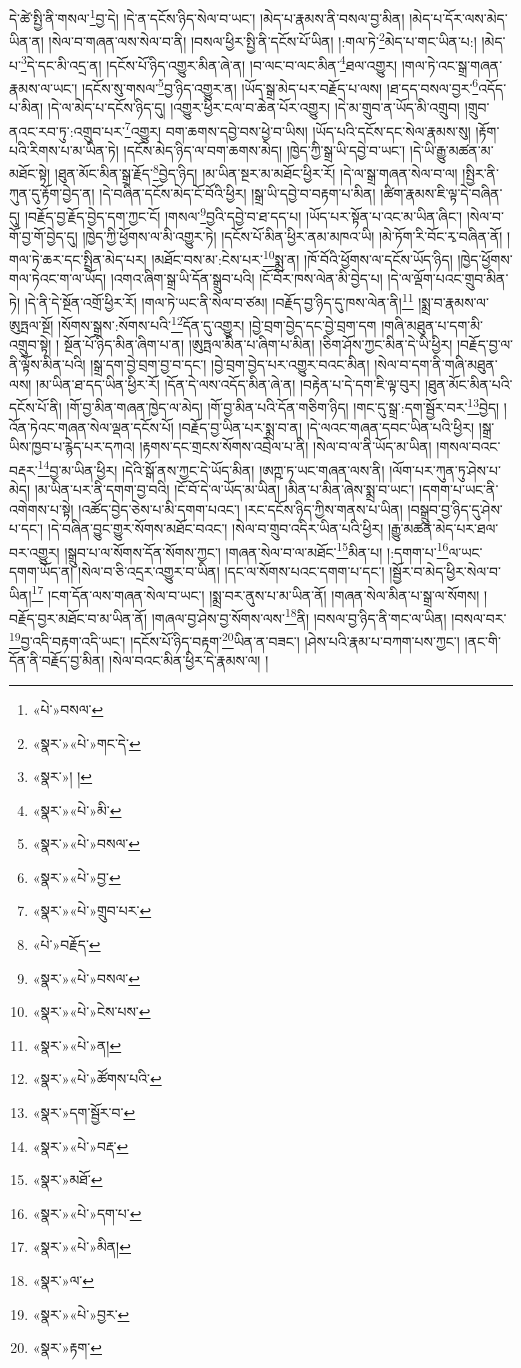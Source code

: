 དེ་ཚེ་སྤྱི་ནི་གསལ་\footnote{«པེ་»བསལ་}བྱ་དེ། །དེ་ན་དངོས་ཉིད་སེལ་བ་ཡང་། །མེད་པ་རྣམས་ནི་བསལ་བྱ་མིན། །མེད་པ་དོར་ལས་མེད་ཡིན་ན། །སེལ་བ་གཞན་ལས་སེལ་བ་ནི། །བསལ་ཕྱིར་སྤྱི་ནི་དངོས་པོ་ཡིན། །:གལ་ཏེ་\footnote{«སྣར་»«པེ་»གང་དེ་}མེད་པ་གང་ཡིན་པ:། །མེད་པ་\footnote{«སྣར་»། །}དེ་དང་མི་འདྲ་ན། །དངོས་པོ་ཉིད་འགྱུར་མིན་ཞེ་ན། །བ་ལང་བ་ལང་མིན་\footnote{«སྣར་»«པེ་»མི་}ཐལ་འགྱུར། །གལ་ཏེ་འང་སྒྲ་གཞན་རྣམས་ལ་ཡང་། །དངོས་སུ་གསལ་\footnote{«སྣར་»«པེ་»བསལ་}བྱ་ཉིད་འགྱུར་ན། །ཡོད་སྒྲ་མེད་པར་བརྗོད་པ་ལས། །ཐ་དད་བསལ་བྱར་\footnote{«སྣར་»«པེ་»བྱ་}འདོད་པ་མིན། །དེ་ལ་མེད་པ་དངོས་ཉིད་དུ། །འགྱུར་ཕྱིར་ངལ་བ་ཆེན་པོར་འགྱུར། །དེ་མ་གྲུབ་ན་ཡོད་མི་འགྲུབ། །གྲུབ་ནའང་རབ་ཏུ་:འགྲུབ་པར་\footnote{«སྣར་»«པེ་»གྲུབ་པར་}འགྱུར། བག་ཆགས་དབྱེ་བས་ཕྱེ་བ་ཡིས། །ཡོད་པའི་དངོས་དང་སེལ་རྣམས་སུ། །རྟོག་པའི་རིགས་པ་མ་ཡིན་ཏེ། །དངོས་མེད་ཉིད་ལ་བག་ཆགས་མེད། །ཁྱེད་ཀྱི་སྒྲ་ཡི་དབྱེ་བ་ཡང་། །དེ་ཡི་རྒྱུ་མཚན་མ་མཐོང་སྟེ། །ཐུན་མོང་མིན་སྒྲ་རྗོད་\footnote{«པེ་»བརྗོད་}བྱེད་ཉིད། །མ་ཡིན་སྔར་མ་མཐོང་ཕྱིར་རོ། །དེ་ལ་སྒྲ་གཞན་སེལ་བ་ལ། །སྤྱིར་ནི་ཀུན་དུ་རྟོག་བྱེད་ན། །དེ་བཞིན་དངོས་མེད་ངོ་བོའི་ཕྱིར། །སྒྲ་ཡི་དབྱེ་བ་བརྟག་པ་མིན། །ཚིག་རྣམས་ཇི་ལྟ་དེ་བཞིན་དུ། །བརྗོད་བྱ་རྗོད་བྱེད་དག་ཀྱང་ངོ། །གསལ་\footnote{«སྣར་»«པེ་»བསལ་}བྱའི་དབྱེ་བ་ཐ་དད་པ། །ཡོད་པར་སྟོན་པ་འང་མ་ཡིན་ཞིང་། །སེལ་བ་གོ་བྱ་གོ་བྱེད་དུ། །ཁྱེད་ཀྱི་ཕྱོགས་ལ་མི་འགྱུར་ཏེ། །དངོས་པོ་མིན་ཕྱིར་ནམ་མཁའ་ཡི། །མེ་ཏོག་རི་བོང་རྭ་བཞིན་ནོ། །གལ་ཏེ་ཆར་དང་སྤྲིན་མེད་པར། །མཐོང་བས་མ་:ངེས་པར་\footnote{«སྣར་»«པེ་»ངེས་པས་}སྨྲ་ན། །ཁོ་བོའི་ཕྱོགས་ལ་དངོས་ཡོད་ཉིད། །ཁྱེད་ཕྱོགས་གལ་ཏེའང་ག་ལ་ཡོད། །འགའ་ཞིག་སྒྲ་ཡི་དོན་སྒྲུབ་པའི། །ངོ་བོར་ཁས་ལེན་མི་བྱེད་པ། །དེ་ལ་ལྡོག་པའང་གྲུབ་མིན་ཏེ། །དེ་ནི་དེ་སྔོན་འགྲོ་ཕྱིར་རོ། །གལ་ཏེ་ཡང་ནི་སེལ་བ་ཙམ། །བརྗོད་བྱ་ཉིད་དུ་ཁས་ལེན་ནི།\footnote{«སྣར་»«པེ་»ན།} །སྨྲ་བ་རྣམས་ལ་ཨུཏྤལ་སྔོ། །སོགས་སྒྲས་:སོགས་པའི་\footnote{«སྣར་»«པེ་»ཚོགས་པའི་}དོན་དུ་འགྱུར། །བྱེ་བྲག་བྱེད་དང་བྱེ་བྲག་དག །གཞི་མཐུན་པ་དག་མི་འགྲུབ་སྟེ། །
སྔོན་པོ་ཉིད་མིན་ཞིག་པ་ན། །ཨུཏྤལ་མིན་པ་ཞིག་པ་མིན། །ཅིག་ཤོས་ཀྱང་མིན་དེ་ཡི་ཕྱིར། །བརྗོད་བྱ་ལ་ནི་ལྟོས་མིན་པའི། །སྒྲ་དག་བྱེ་བྲག་བྱ་བ་དང་། །བྱེ་བྲག་བྱེད་པར་འགྱུར་བའང་མིན། །སེལ་བ་དག་ནི་གཞི་མཐུན་ལས། །མ་ཡིན་ཐ་དད་ཡིན་ཕྱིར་རོ། །དོན་དེ་ལས་འདོད་མིན་ཞེ་ན། །བརྟེན་པ་དེ་དག་ཇི་ལྟ་བུར། །ཐུན་མོང་མིན་པའི་དངོས་པོ་ནི། །གོ་བྱ་མིན་གཞན་ཁྱེད་ལ་མེད། །གོ་བྱ་མིན་པའི་དོན་གཅིག་ཉིད། །གང་དུ་སྒྲ་:དག་སྦྱོར་བར་\footnote{«སྣར་»དག་སྦྱོར་བ་}བྱེད། །འོན་ཏེའང་གཞན་སེལ་ལྡན་དངོས་པོ། །བརྗོད་བྱ་ཡིན་པར་སྨྲ་བ་ན། །དེ་ལའང་གཞན་དབང་ཡིན་པའི་ཕྱིར། །སྒྲ་ཡིས་ཁྱབ་པ་རྙེད་པར་དཀའ། །རྟགས་དང་གྲངས་སོགས་འབྲེལ་པ་ནི། །སེལ་བ་ལ་ནི་ཡོད་མ་ཡིན། །གསལ་བའང་བརྡར་\footnote{«སྣར་»«པེ་»བརྡ་}བྱ་མ་ཡིན་ཕྱིར། །དེའི་སྒོ་ནས་ཀྱང་དེ་ཡོད་མིན། །ཨཀྵ་ཏ་ཡང་གཞན་ལས་ནི། །ལོག་པར་ཀུན་ཏུ་ཤེས་པ་མེད། །མ་ཡིན་པར་ནི་དགག་བྱ་བའི། །ངོ་བོ་དེ་ལ་ཡོད་མ་ཡིན། །མིན་པ་མིན་ཞེས་སྨྲ་བ་ཡང་། །དགག་པ་ཡང་ནི་འགེགས་པ་སྟེ། །འཚོད་བྱེད་ཅེས་པ་མི་དགག་པའང་། །རང་དངོས་ཉིད་ཀྱིས་གནས་པ་ཡིན། །བསྒྲུབ་བྱ་ཉིད་དུ་ཤེས་པ་དང་། །དེ་བཞིན་བྱུང་གྱུར་སོགས་མཐོང་བའང་། །སེལ་བ་གྲུབ་འདིར་ཡིན་པའི་ཕྱིར། །རྒྱུ་མཚན་མེད་པར་ཐལ་བར་འགྱུར། །སྒྲུབ་པ་ལ་སོགས་དོན་སོགས་ཀྱང་། །གཞན་སེལ་བ་ལ་མཐོང་\footnote{«སྣར་»མཐོ་}མིན་པ། །:དགག་པ་\footnote{«སྣར་»«པེ་»དག་པ་}ལ་ཡང་དགག་ཡོད་ན། །སེལ་བ་ཅི་འདྲར་འགྱུར་བ་ཡིན། །དང་ལ་སོགས་པའང་དགག་པ་དང་། །སྦྱོར་བ་མེད་ཕྱིར་སེལ་བ་ཡིན།\footnote{«སྣར་»«པེ་»མིན།} །ངག་དོན་ལས་གཞན་སེལ་བ་ཡང་། །སྨྲ་བར་ནུས་པ་མ་ཡིན་ནོ། །གཞན་སེལ་མིན་པ་སྒྲ་ལ་སོགས། །བརྗོད་བྱར་མཐོང་བ་མ་ཡིན་ནོ། །གཞལ་བྱ་ཤེས་བྱ་སོགས་ལས་\footnote{«སྣར་»ལ་}ནི། །བསལ་བྱ་ཉིད་ནི་གང་ལ་ཡིན། །བསལ་བར་\footnote{«སྣར་»«པེ་»བྱར་}བྱ་འདི་བརྟག་འདི་ཡང་། །དངོས་པོ་ཉིད་བརྟག་\footnote{«སྣར་»རྟག་}ཡིན་ན་བཟང་། །ཤེས་པའི་རྣམ་པ་བཀག་པས་ཀྱང་། །ནང་གི་དོན་ནི་བརྗོད་བྱ་མིན། །སེལ་བའང་མིན་ཕྱིར་དེ་རྣམས་ལ། །
